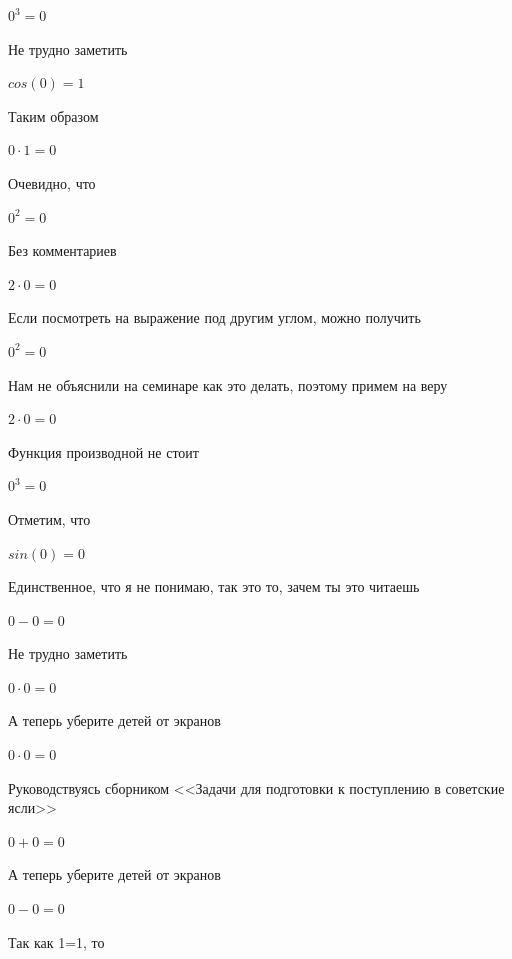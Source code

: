\documentclass[12pt,a4paper,fleqn]{article}
\begin{document}
\begin{center}$0^{3} = 0$\end{center}
Не трудно заметить

\begin{center}$cos(0) = 1$\end{center}
Таким образом

\begin{center}$0 \cdot 1 = 0$\end{center}
Очевидно, что

\begin{center}$0^{2} = 0$\end{center}
Без комментариев\cite{link4}

\begin{center}$2 \cdot 0 = 0$\end{center}
Если посмотреть на выражение под другим углом, можно получить

\begin{center}$0^{2} = 0$\end{center}
Нам не объяснили на семинаре как это делать, поэтому примем на веру

\begin{center}$2 \cdot 0 = 0$\end{center}
Функция производной не стоит\cite{link2}

\begin{center}$0^{3} = 0$\end{center}
Отметим, что

\begin{center}$sin(0) = 0$\end{center}
Единственное, что я не понимаю, так это то, зачем ты это читаешь

\begin{center}$0-0 = 0$\end{center}
Не трудно заметить

\begin{center}$0 \cdot 0 = 0$\end{center}
А теперь уберите детей от экранов

\begin{center}$0 \cdot 0 = 0$\end{center}
Руководствуясь сборником <<Задачи для подготовки к поступлению в советские ясли>>\cite{link1}

\begin{center}$0+0 = 0$\end{center}
А теперь уберите детей от экранов

\begin{center}$0-0 = 0$\end{center}
Так как 1=1, то\cite{link4}
\end{document}
